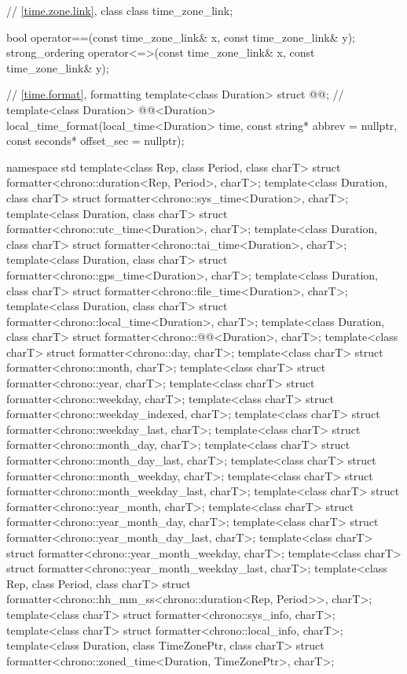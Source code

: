 \begin{codeblock}
{  // \ref{time.zone.link}, class 
  class time_zone_link;

  bool operator==(const time_zone_link& x, const time_zone_link& y);
  strong_ordering operator<=>(const time_zone_link& x, const time_zone_link& y);

  // \ref{time.format}, formatting
  template<class Duration> struct @@;        // \expos
  template<class Duration>
    @@<Duration>
      local_time_format(local_time<Duration> time, const string* abbrev = nullptr,
                        const seconds* offset_sec = nullptr);
}

namespace std {
  template<class Rep, class Period, class charT>
    struct formatter<chrono::duration<Rep, Period>, charT>;
  template<class Duration, class charT>
    struct formatter<chrono::sys_time<Duration>, charT>;
  template<class Duration, class charT>
    struct formatter<chrono::utc_time<Duration>, charT>;
  template<class Duration, class charT>
    struct formatter<chrono::tai_time<Duration>, charT>;
  template<class Duration, class charT>
    struct formatter<chrono::gps_time<Duration>, charT>;
  template<class Duration, class charT>
    struct formatter<chrono::file_time<Duration>, charT>;
  template<class Duration, class charT>
    struct formatter<chrono::local_time<Duration>, charT>;
  template<class Duration, class charT>
    struct formatter<chrono::@@<Duration>, charT>;
  template<class charT> struct formatter<chrono::day, charT>;
  template<class charT> struct formatter<chrono::month, charT>;
  template<class charT> struct formatter<chrono::year, charT>;
  template<class charT> struct formatter<chrono::weekday, charT>;
  template<class charT> struct formatter<chrono::weekday_indexed, charT>;
  template<class charT> struct formatter<chrono::weekday_last, charT>;
  template<class charT> struct formatter<chrono::month_day, charT>;
  template<class charT> struct formatter<chrono::month_day_last, charT>;
  template<class charT> struct formatter<chrono::month_weekday, charT>;
  template<class charT> struct formatter<chrono::month_weekday_last, charT>;
  template<class charT> struct formatter<chrono::year_month, charT>;
  template<class charT> struct formatter<chrono::year_month_day, charT>;
  template<class charT> struct formatter<chrono::year_month_day_last, charT>;
  template<class charT> struct formatter<chrono::year_month_weekday, charT>;
  template<class charT> struct formatter<chrono::year_month_weekday_last, charT>;
  template<class Rep, class Period, class charT>
    struct formatter<chrono::hh_mm_ss<chrono::duration<Rep, Period>>, charT>;
  template<class charT> struct formatter<chrono::sys_info, charT>;
  template<class charT> struct formatter<chrono::local_info, charT>;
  template<class Duration, class TimeZonePtr, class charT>
    struct formatter<chrono::zoned_time<Duration, TimeZonePtr>, charT>;
}


\end{codeblock}
